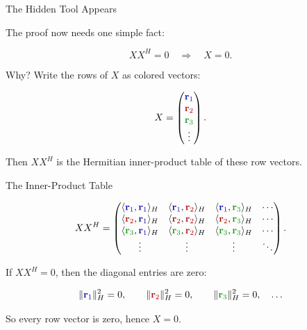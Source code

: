 \documentclass[10pt]{beamer}
\theoremstyle{definition}
\newcommand{\rd}[1]{{\color{red!70!black}#1}}
\newcommand{\bl}[1]{{\color{blue!70!black}#1}}
\newcommand{\gn}[1]{{\color{green!60!black}#1}}
\begin{document}
\begin{frame}{The Hidden Tool Appears}

The proof now needs one simple fact:

$$
XX^H=0\quad\Longrightarrow\quad X=0.
$$

\vfill\pause

Why? Write the rows of $X$ as colored vectors:

$$
X=
\begin{pmatrix}
\bl{\mathbf r_1}\\
\rd{\mathbf r_2}\\
\gn{\mathbf r_3}\\
\vdots
\end{pmatrix}.
$$

\vfill

Then $XX^H$ is the Hermitian inner-product table of these row vectors.

\end{frame}


\begin{frame}[shrink=6]{The Inner-Product Table}

$$
XX^H=
\begin{pmatrix}
\langle\bl{\mathbf r_1},\bl{\mathbf r_1}\rangle_H &
\langle\bl{\mathbf r_1},\rd{\mathbf r_2}\rangle_H &
\langle\bl{\mathbf r_1},\gn{\mathbf r_3}\rangle_H & \cdots\\
\langle\rd{\mathbf r_2},\bl{\mathbf r_1}\rangle_H &
\langle\rd{\mathbf r_2},\rd{\mathbf r_2}\rangle_H &
\langle\rd{\mathbf r_2},\gn{\mathbf r_3}\rangle_H & \cdots\\
\langle\gn{\mathbf r_3},\bl{\mathbf r_1}\rangle_H &
\langle\gn{\mathbf r_3},\rd{\mathbf r_2}\rangle_H &
\langle\gn{\mathbf r_3},\gn{\mathbf r_3}\rangle_H & \cdots\\
\vdots&\vdots&\vdots&\ddots
\end{pmatrix}.
$$

\vfill\pause

If $XX^H=0$, then the diagonal entries are zero:

$$
\|\bl{\mathbf r_1}\|_H^2=0,
\qquad
\|\rd{\mathbf r_2}\|_H^2=0,
\qquad
\|\gn{\mathbf r_3}\|_H^2=0,
\quad\ldots
$$

\vfill

So every row vector is zero, hence $X=0$.

\end{frame}
\end{document}
